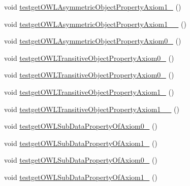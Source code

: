 \begin{DoxyCompactItemize}
\item 
void \hyperlink{classorg_1_1semanticweb_1_1owlapi_1_1api_1_1test_1_1_null_check_test_case_ac9b5d58d773ec78f16e2e2983f6b56b2}{testget\-O\-W\-L\-Asymmetric\-Object\-Property\-Axiom1\-\_} ()
\item 
void \hyperlink{classorg_1_1semanticweb_1_1owlapi_1_1api_1_1test_1_1_null_check_test_case_a379a3468c9b08fa74e7c381e75a33d05}{testget\-O\-W\-L\-Asymmetric\-Object\-Property\-Axiom1\-\_\-\_} ()
\item 
void \hyperlink{classorg_1_1semanticweb_1_1owlapi_1_1api_1_1test_1_1_null_check_test_case_ab31e2f41ca5f2a0e70f13ae6d5cf2f17}{testget\-O\-W\-L\-Asymmetric\-Object\-Property\-Axiom0\-\_} ()
\item 
void \hyperlink{classorg_1_1semanticweb_1_1owlapi_1_1api_1_1test_1_1_null_check_test_case_a323641009b9555ba53af9d6ac64cd8a6}{testget\-O\-W\-L\-Transitive\-Object\-Property\-Axiom0\-\_} ()
\item 
void \hyperlink{classorg_1_1semanticweb_1_1owlapi_1_1api_1_1test_1_1_null_check_test_case_af21da722676f7a2904c9bb5c95ec1eac}{testget\-O\-W\-L\-Transitive\-Object\-Property\-Axiom0\-\_} ()
\item 
void \hyperlink{classorg_1_1semanticweb_1_1owlapi_1_1api_1_1test_1_1_null_check_test_case_aecc2c4f94a535c16d310b459214b2138}{testget\-O\-W\-L\-Transitive\-Object\-Property\-Axiom1\-\_} ()
\item 
void \hyperlink{classorg_1_1semanticweb_1_1owlapi_1_1api_1_1test_1_1_null_check_test_case_a5f431f2404c2acc87730dd41e9eb09bc}{testget\-O\-W\-L\-Transitive\-Object\-Property\-Axiom1\-\_\-\_} ()
\item 
void \hyperlink{classorg_1_1semanticweb_1_1owlapi_1_1api_1_1test_1_1_null_check_test_case_a3fc7482c923f449ad09353ae73b2e15c}{testget\-O\-W\-L\-Sub\-Data\-Property\-Of\-Axiom0\-\_} ()
\item 
void \hyperlink{classorg_1_1semanticweb_1_1owlapi_1_1api_1_1test_1_1_null_check_test_case_a68bafc43661047442711eadd65004e19}{testget\-O\-W\-L\-Sub\-Data\-Property\-Of\-Axiom1\-\_} ()
\item 
void \hyperlink{classorg_1_1semanticweb_1_1owlapi_1_1api_1_1test_1_1_null_check_test_case_a335b2a28846b3a111289faffdd404e7f}{testget\-O\-W\-L\-Sub\-Data\-Property\-Of\-Axiom0\-\_} ()
\item 
void \hyperlink{classorg_1_1semanticweb_1_1owlapi_1_1api_1_1test_1_1_null_check_test_case_ab0d2edbf62baf5768eb227e0d5323990}{testget\-O\-W\-L\-Sub\-Data\-Property\-Of\-Axiom1\-\_} ()

\end{DoxyCompactItemize}
